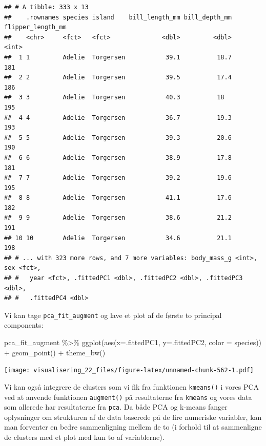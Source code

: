 \documentclass[
]{book}
\newenvironment{Shaded}{\begin{snugshade}}{\end{snugshade}}
\newcommand{\AttributeTok}[1]{\textcolor[rgb]{0.77,0.63,0.00}{#1}}
\newcommand{\FunctionTok}[1]{\textcolor[rgb]{0.00,0.00,0.00}{#1}}
\newcommand{\NormalTok}[1]{#1}
\newcommand{\SpecialCharTok}[1]{\textcolor[rgb]{0.00,0.00,0.00}{#1}}
\begin{document}
\begin{verbatim}
## # A tibble: 333 x 13
##    .rownames species island    bill_length_mm bill_depth_mm flipper_length_mm
##    <chr>     <fct>   <fct>              <dbl>         <dbl>             <int>
##  1 1         Adelie  Torgersen           39.1          18.7               181
##  2 2         Adelie  Torgersen           39.5          17.4               186
##  3 3         Adelie  Torgersen           40.3          18                 195
##  4 4         Adelie  Torgersen           36.7          19.3               193
##  5 5         Adelie  Torgersen           39.3          20.6               190
##  6 6         Adelie  Torgersen           38.9          17.8               181
##  7 7         Adelie  Torgersen           39.2          19.6               195
##  8 8         Adelie  Torgersen           41.1          17.6               182
##  9 9         Adelie  Torgersen           38.6          21.2               191
## 10 10        Adelie  Torgersen           34.6          21.1               198
## # ... with 323 more rows, and 7 more variables: body_mass_g <int>, sex <fct>,
## #   year <fct>, .fittedPC1 <dbl>, .fittedPC2 <dbl>, .fittedPC3 <dbl>,
## #   .fittedPC4 <dbl>
\end{verbatim}

Vi kan tage \texttt{pca\_fit\_augment} og lave et plot af de første to principal components:

\begin{Shaded}
\begin{Highlighting}[]
\NormalTok{pca\_fit\_augment  }\SpecialCharTok{\%\textgreater{}\%} 
  \FunctionTok{ggplot}\NormalTok{(}\FunctionTok{aes}\NormalTok{(}\AttributeTok{x=}\NormalTok{.fittedPC1, }\AttributeTok{y=}\NormalTok{.fittedPC2, }\AttributeTok{color =}\NormalTok{ species)) }\SpecialCharTok{+} 
  \FunctionTok{geom\_point}\NormalTok{() }\SpecialCharTok{+}
  \FunctionTok{theme\_bw}\NormalTok{()}
\end{Highlighting}
\end{Shaded}

\texttt{[image: visualisering\_22\_files/figure-latex/unnamed-chunk-562-1.pdf]}

Vi kan også integrere de clusters som vi fik fra funktionen \texttt{kmeans()} i vores PCA ved at anvende funktionen \texttt{augment()} på resultaterne fra \texttt{kmeans} og vores data som allerede har resultaterne fra \texttt{pca}. Da både PCA og k-means fanger oplysninger om strukturen af de data baserede på de fire numeriske variabler, kan man forventer en bedre sammenligning mellem de to (i forhold til at sammenligne de clusters med et plot med kun to af variablerne).
\end{document}
